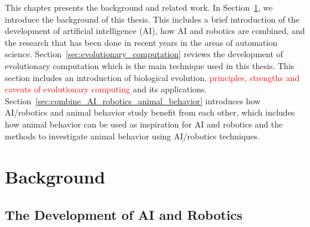 This chapter presents the background and related work. In Section~\ref{sec:background}, we introduce the background of this thesis. This includes a brief introduction of the development of artificial intelligence (AI), how AI and robotics are combined, and the research that has been done in recent years in the areas of automation science. Section~\ref{sec:evolutionary_computation} reviews the development of evolutionary computation which is the main technique used in this thesis. This section includes an introduction of biological evolution, \textcolor{red}{principles, strengths and caveats of evolutionary computing} and its applications. Section~\ref{sec:combine_AI_robotics_animal_behavior} introduces how AI/robotics and animal behavior study benefit from each other, which includes how animal behavior can be used as inspiration for AI and robotics and the methods to investigate animal behavior using AI/robotics techniques.  

\section{Background}\label{sec:background}

\subsection{The Development of AI and Robotics}\label{sec:development_of_AI_Robotics}

